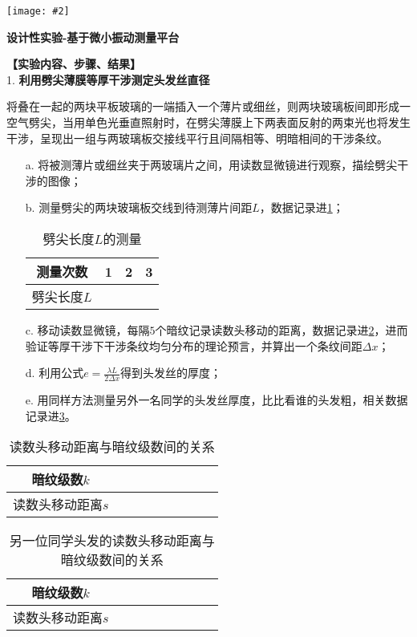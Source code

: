 \documentclass[11pt,a4paper]{ctexart}
\newcommand{\ExpeName}{设计性实验-基于微小振动测量平台}
\newcommand{\cpic}[2]{
\begin{center}
\texttt{[image: \#2]}
\end{center}
}
\begin{document}
\newpage%
\cpic{0.255}{e2}%
\begin{center}
\LARGE{\textbf{\ExpeName}}
\end{center}
\textbf{【实验内容、步骤、结果】}
\\
1. \textbf{利用劈尖薄膜等厚干涉测定头发丝直径}\par
将叠在一起的两块平板玻璃的一端插入一个薄片或细丝，则两块玻璃板间即形成一空气劈尖，当用单色光垂直照射时，在劈尖薄膜上下两表面反射的两束光也将发生干涉，呈现出一组与两玻璃板交接线平行且间隔相等、明暗相间的干涉条纹。
\begin{enumerate}
\item[a.] 将被测薄片或细丝夹于两玻璃片之间，用读数显微镜进行观察，描绘劈尖干涉的图像；
\item[b.] 测量劈尖的两块玻璃板交线到待测薄片间距$L$，数据记录进\cref{table0}；
\begin{table}[H]
\centering
\caption{劈尖长度$L$的测量}
\label{table0}
\begin{tabular}{|c|p{12mm}|p{12mm}|p{12mm}|}
\hline
测量次数 & 1 & 2 & 3  \\ \hline
劈尖长度$L$ &  &  &   \\ \hline
\end{tabular}
\end{table}
\item[c.] 移动读数显微镜，每隔$5$个暗纹记录读数头移动的距离，数据记录进\cref{table1}，进而验证等厚干涉下干涉条纹均匀分布的理论预言，并算出一个条纹间距$\Delta x$；
\item[d.] 利用公式$e = \frac{\lambda L}{2 \Delta x}$得到头发丝的厚度；
\item[e.] 用同样方法测量另外一名同学的头发丝厚度，比比看谁的头发粗，相关数据记录进\cref{table2}。
\end{enumerate}
\begin{table}[H]
\centering
\caption{读数头移动距离与暗纹级数间的关系}
\label{table1}
\begin{tabular}{|c|p{10mm}|p{10mm}|p{10mm}|p{10mm}|p{10mm}|p{10mm}|p{10mm}|p{10mm}|}
\hline
暗纹级数$k$ &  &  &  &  &  &  &  &  \\ \hline
读数头移动距离$s$ &  &  &  &  &  &  &  &  \\ \hline
\end{tabular}
\end{table}
\begin{table}[H]
\centering
\caption{另一位同学头发的读数头移动距离与暗纹级数间的关系}
\label{table2}
\begin{tabular}{|c|p{10mm}|p{10mm}|p{10mm}|p{10mm}|p{10mm}|p{10mm}|p{10mm}|p{10mm}|}
\hline
暗纹级数$k$ &  &  &  &  &  &  &  &  \\ \hline
读数头移动距离$s$ &  &  &  &  &  &  &  &  \\ \hline
\end{tabular}
\end{table}
\end{document}
